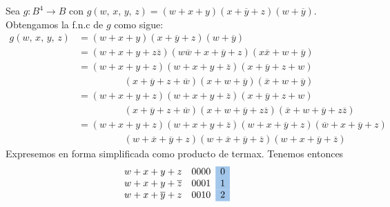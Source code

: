 \newpage

\begin{myexample}
    Sea $g: B^4 \longrightarrow B$ con $g(w, \, x, \, y, \, z) = (w + x + y)(x + \overline{y} + z)(w + \overline{y})$. Obtengamos la f.n.c de $g$ como sigue:
    \begin{align*}
        g(w, \, x, \, y, \, z) & = (w + x + y)(x + \overline{y} + z)(w + \overline{y}) \\
        & = (w + x + y + z\overline{z})(w\overline{w} + x + \overline{y} + z)(x\overline{x} + w + \overline{y}) \\
        & = (w + x + y + z)(w + x + y + \overline{z})(x + \overline{y} + z + w) \\
        & \hspace{2cm} (x + \overline{y} + z + \overline{w})(x + w + \overline{y})(\overline{x} + w + \overline{y}) \\
        & = (w + x + y + z)(w + x + y + \overline{z})(x + \overline{y} + z + w) \\
        & \hspace{2cm} (x + \overline{y} + z + \overline{w})(x + w + \overline{y} + z\overline{z})(\overline{x} + w + \overline{y} + z\overline{z}) \\
        & = (w + x + y + z)(w + x + y + \overline{z})(w + x + \overline{y} + z)(\overline{w} + x + \overline{y} + z) \\
        & \hspace{2cm} (w + \overline{x} + \overline{y} + z)(w + \overline{x} + \overline{y} + \overline{z})(w + x + \overline{y} + \overline{z})
    \end{align*}
    Expresemos en forma simplificada como producto de termax. Tenemos entonces
    $$\begin{array}{llr}
        w+x+y+z & 0000 & \cellcolor{DodgerBlue3!40}{0} \\
        w+x+y+\overline{z} & 0001 & \cellcolor{DodgerBlue3!40}{1} \\
        w+x+\overline{y}+z & 0010 & \cellcolor{DodgerBlue3!40}{2}
    \end{array} \quad \begin{array}{llr}

\end{array}$$
\end{myexample}

